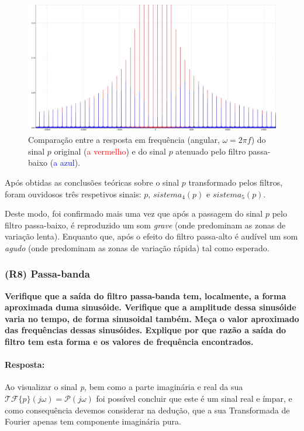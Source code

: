 \begin{figure}[H]
    \centering
    \includegraphics[width = 0.5\linewidth]{prints/filtragem_imperfeita.png}   
    \caption{Comparação entre a resposta em frequência (angular, \(\omega = 2\pi f\)) do sinal \(p\) original (\textcolor{Red}{a vermelho}) e do sinal \(p\) atenuado pelo filtro passa-baixo (\textcolor{Blue}{a azul}).}
    \label{fig:filtragem_imperfeita}
\end{figure}

Após obtidas as conclusões teóricas sobre o sinal \(p\) transformado pelos filtros, foram ouvidos\footnotemark[6] os três respetivos sinais: \(p\), \(sistema_4(p)\) e \(sistema_5(p)\). 

Deste modo, foi confirmado mais uma vez que após a passagem do sinal \(p\) pelo filtro passa-baixo, é reproduzido um som \textit{grave} (onde predominam as zonas de variação lenta). Enquanto que, após o efeito do filtro passa-alto é audível um som \textit{agudo} (onde predominam as zonas de variação rápida) tal como esperado.


\clearpage
\subsubsection{(R8) Passa-banda}
\label{subsubsec:R8}
\textbf{Verifique que a saída do filtro passa-banda tem, localmente, a forma aproximada duma sinusóide. Verifique que a amplitude dessa sinusóide varia no tempo, de forma sinusoidal também. Meça o valor aproximado das frequências dessas sinusóides. Explique por que razão a saída do filtro tem esta forma e os valores de frequência encontrados.}
\paragraph{Resposta:} %
Ao visualizar o sinal \textit{p}, bem como a parte imaginária e real da sua \(\mathcal{TF}\{p\}(j\omega) = \mathcal{P}(j\omega)\) foi possível concluir que este é um sinal real e ímpar\footnotemark[7], e como consequência devemos considerar na dedução, que a sua Transformada de Fourier apenas tem componente imaginária pura.


